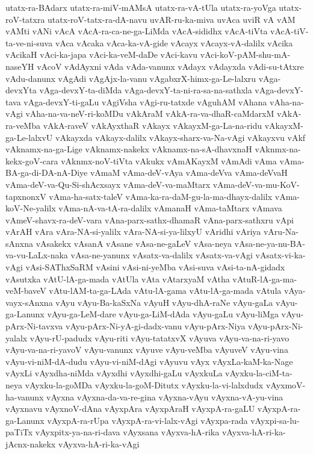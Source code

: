{utatx-ra-BAdarx
utatx-ra-miV-mAMsA
utatx-ra-vA-tUla
utatx-ra-yoVga
utatx-roV-tatxra
utatx-roV-tatx-ra-dA-navu
uvAR-ru-ka-miva
uvAca
uviR
vA
vAM
vAMti
vANi
vAcA
vAcA-ra-ca-ne-ga-LiMda
vAcA-sididhx
vAcA-tiVta
vAcA-tiV-ta-ve-ni-suva
vAca
vAcaka
vAca-ka-vA-gide
vAcayx
vAcayx-vA-dalilx
vAcika
vAcikaH
vAci-ka-japa
vAci-ka-veM-daDe
vAci-kavu
vAci-koV-pAM-shu-mA-naseYH
vAcoV
vAdAyxni
vAda
vAda-vanunx
vAdayx
vAdayxda
vAdi-su-tAtxre
vAdu-danunx
vAgAdi
vAgAjx-la-vanu
vAgabxrX-himx-ga-Le-lalxru
vAga-devxYta
vAga-devxY-ta-diMda
vAga-devxY-ta-ni-ra-sa-na-sathxla
vAga-devxY-tava
vAga-devxY-ti-gaLu
vAgiVsha
vAgi-ru-tatxde
vAguhAM
vAhana
vAha-na-vAgi
vAha-na-va-neV-ri-koMDu
vAkAraM
vAkA-ra-va-dhaR-caMdarxM
vAkA-ra-veMba
vAkA-raveV
vAkAyxthaR
vAkayx
vAkayxM-ga-La-na-ridu
vAkayxM-ga-Le-lalxvU
vAkayxda
vAkayx-dalilx
vAkayx-sharx-va-Na-vAgi
vAkayxvu
vAkf
vAknamx-na-ga-Lige
vAknamx-nakekx
vAknamx-na-sA-dhavxnaH
vAknmx-na-kekx-goV-cara
vAknmx-noV-tiVta
vAkukx
vAmAKayxM
vAmAdi
vAma
vAma-BA-ga-di-DA-nA-Diye
vAmaM
vAma-deV-vAya
vAma-deVva
vAma-deVvaH
vAma-deV-va-Qu-Si-shAcxsayx
vAma-deV-va-maMtarx
vAma-deV-va-mu-KoV-tapxnonxV
vAma-ha-satx-taleV
vAma-ka-ra-daM-gu-la-ma-dhayx-dalilx
vAma-koV-Ne-yalilx
vAma-nA-va-tA-ra-dalilx
vAmanaH
vAma-taMtarx
vAmava
vAmeV-shavx-ra-deV-vara
vAna-parx-sathx-dhamaR
vAna-parx-sathxru
vApi
vArAH
vAra
vAra-NA-si-yalilx
vAra-NA-si-ya-lilxyU
vAridhi
vAriya
vAru-Na-sAnxna
vAsakekx
vAsanA
vAsane
vAsa-ne-gaLeV
vAsa-neya
vAsa-ne-ya-nu-BA-va-vu-LaLx-naka
vAsa-ne-yanunx
vAsatx-va-dalilx
vAsatx-va-vAgi
vAsatx-vi-ka-vAgi
vAsi-SAThxSaRM
vAsini
vAsi-ni-yeMba
vAsi-suva
vAsi-ta-nA-gidadx
vAsutxka
vAtU-lA-ga-mada
vAtUla
vAta
vAtarxyaM
vAtha
vAtuR-lA-ga-ma-veM-baveV
vAtu-lAM-ta-ga-LAda
vAtu-lA-gama
vAtu-lA-ga-mada
vAtula
vAya-vayx-sAnxna
vAyu
vAyu-Ba-kaSxNa
vAyuH
vAyu-dhA-raNe
vAyu-gaLa
vAyu-ga-Lanunx
vAyu-ga-LeM-dare
vAyu-ga-LiM-dAda
vAyu-gaLu
vAyu-liMga
vAyu-pArx-Ni-tavxva
vAyu-pArx-Ni-yA-gi-dadx-vanu
vAyu-pArx-Niya
vAyu-pArx-Ni-yalalx
vAyu-rU-padudx
vAyu-riti
vAyu-tatatxvX
vAyuva
vAyu-va-na-ri-yavo
vAyu-va-na-ri-yavoV
vAyu-vanunx
vAyuve
vAyu-veMba
vAyuveV
vAyu-vina
vAyu-vi-niM-dA-dudu
vAyu-vi-niM-dAgi
vAyuvu
vAyx
vAyxLa-kaM-ka-Nage
vAyxLi
vAyxdha-niMda
vAyxdhi
vAyxdhi-gaLu
vAyxkuLa
vAyxku-la-ciM-ta-neya
vAyxku-la-goMDa
vAyxku-la-goM-Ditutx
vAyxku-la-vi-lalxdudx
vAyxmoV-ha-vanunx
vAyxna
vAyxna-da-va-re-gina
vAyxna-vAyu
vAyxna-vA-yu-vina
vAyxnavu
vAyxnoV-dAna
vAyxpAra
vAyxpAraH
vAyxpA-ra-gaLU
vAyxpA-ra-ga-Lanunx
vAyxpA-ra-rUpa
vAyxpA-ra-vi-lalx-vAgi
vAyxpa-rada
vAyxpi-sa-lu-paTiTx
vAyxpitx-ya-na-ri-dava
vAyxsana
vAyxva-hA-rika
vAyxva-hA-ri-ka-jAcnx-nakekx
vAyxva-hA-ri-ka-vAgi
}
